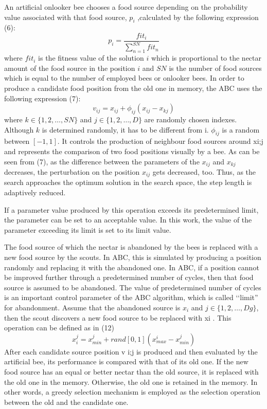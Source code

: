 \documentclass[pdftex,11pt]{article}
\begin{document}
An artificial onlooker bee chooses a food source depending on the probability value associated with that food source, $p_i$ ,calculated by the following expression (6):
\begin{equation}
p_i = \frac{{fit}_i}{\sum^{SN}_{n=1}{fit}_n}
\end{equation}
where ${fit}_i$ is the fitness value of the solution $i$ which is proportional to the nectar amount of the food source in the position $i$ and $SN$ is the number of food sources which is equal to the number of employed bees or onlooker bees.
In order to produce a candidate food position from the old one in memory, the ABC uses the following expression (7):
\begin{equation}
v_{ij} = x_{ij} + \phi_{ij}(x_{ij} - x_{kj})
\end{equation}
where $k \in \{1,2,\dots,SN\}$ and $j \in \{1,2,\dots,D\}$ are randomly chosen indexes. Although $k$ is determined randomly, it has to be different from i. $\phi_{ij}$ is a random between $[-1,1]$. It controls the production of neighbour food sources around xi;j and represents the comparison of two food positions visually by a bee. As can be seen from (7), as the difference between the parameters of the $x_{ij}$ and $x_{kj}$ decreases, the perturbation on the position $x_{ij}$ gets decreased, too. Thus, as the search approaches the optimum solution in the search space, the step length is adaptively reduced.

If a parameter value produced by this operation exceeds its predetermined limit, the parameter can be set to an acceptable value. In this work, the value of the parameter exceeding its limit is set to its limit value.

The food source of which the nectar is abandoned by the bees is replaced with a new food source by the scouts. In ABC, this is simulated by producing a position randomly and replacing it with the abandoned one. In ABC, if a position cannot be improved further through a predetermined number of cycles, then that food source is assumed to be abandoned. The value of predetermined number of cycles is an important control parameter of the ABC algorithm, which is called ‘‘limit” for abandonment. Assume that the abandoned source is $x_i$ and $j \in \{1, 2, \dots , Dg\}$, then the scout discovers a new food source to be replaced with xi . This operation can be defined as in (12)
\begin{equation}
x^j_i = x^j_{min} + rand[0,1](x^i_{max} - x^j_{min})
\end{equation}
After each candidate source position v i;j is produced and then evaluated by the artificial bee, its performance is compared with that of its old one. If the new food source has an equal or better nectar than the old source, it is replaced with the old one in the memory. Otherwise, the old one is retained in the memory. In other words, a greedy selection mechanism is employed as the selection operation between the old and the candidate one.
\end{document}

